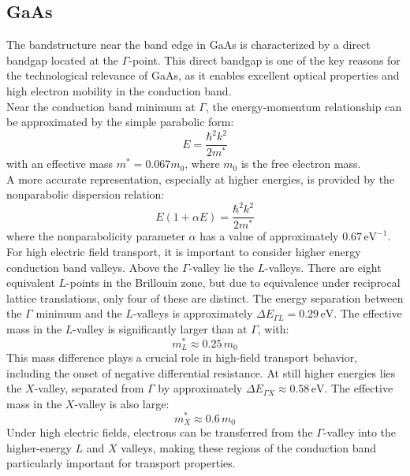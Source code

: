 \subsection{GaAs}
The bandstructure near the band edge in GaAs is characterized by a direct bandgap located at the \( \Gamma \)-point. This direct bandgap is one of the key reasons for the technological relevance of GaAs, as it enables excellent optical properties and high electron mobility in the conduction band.\\
Near the conduction band minimum at \( \Gamma \), the energy-momentum relationship can be approximated by the simple parabolic form:
\begin{equation*}
E = \frac{\hbar^2 k^2}{2 m^*}
\end{equation*}
\noindent
with an effective mass \( m^* = 0.067 m_0 \), where \( m_0 \) is the free electron mass.\\
A more accurate representation, especially at higher energies, is provided by the nonparabolic dispersion relation:
\begin{equation*}
E(1 + \alpha E) = \frac{\hbar^2 k^2}{2 m^*}
\end{equation*}
\noindent
where the nonparabolicity parameter \( \alpha \) has a value of approximately \( 0.67\, \text{eV}^{-1} \).\\
For high electric field transport, it is important to consider higher energy conduction band valleys. Above the \( \Gamma \)-valley lie the \( L \)-valleys. There are eight equivalent \( L \)-points in the Brillouin zone, but due to equivalence under reciprocal lattice translations, only four of these are distinct. The energy separation between the \( \Gamma \) minimum and the \( L \)-valleys is approximately \( \Delta E_{\Gamma L} = 0.29\, \text{eV} \). The effective mass in the \( L \)-valley is significantly larger than at \( \Gamma \), with:
\begin{equation}
m^*_{L} \approx 0.25\, m_0
\end{equation}
This mass difference plays a crucial role in high-field transport behavior, including the onset of negative differential resistance. At still higher energies lies the \( X \)-valley, separated from \( \Gamma \) by approximately \( \Delta E_{\Gamma X} \approx 0.58\, \text{eV} \). The effective mass in the \( X \)-valley is also large:
\begin{equation}
m^*_{X} \approx 0.6\, m_0
\end{equation}
Under high electric fields, electrons can be transferred from the \( \Gamma \)-valley into the higher-energy \( L \) and \( X \) valleys, making these regions of the conduction band particularly important for transport properties.\\
